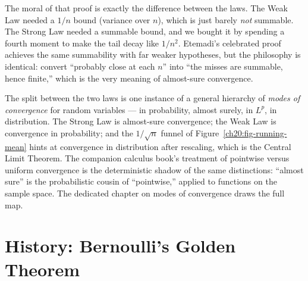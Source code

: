 The moral of that proof is exactly the difference between the laws. The Weak Law needed a $1/n$ bound (variance over $n$), which is just barely \emph{not} summable. The Strong Law needed a summable bound, and we bought it by spending a fourth moment to make the tail decay like $1/n^2$. Etemadi's celebrated proof achieves the same summability with far weaker hypotheses, but the philosophy is identical: convert ``probably close at each $n$'' into ``the misses are summable, hence finite,'' which is the very meaning of almost-sure convergence.

\begin{connectionbox}
The split between the two laws is one instance of a general hierarchy of \emph{modes of convergence} for random variables --- in probability, almost surely, in $L^p$, in distribution. The Strong Law is almost-sure convergence; the Weak Law is convergence in probability; and the $1/\sqrt n$ funnel of Figure~\ref{ch20:fig-running-mean} hints at convergence in distribution after rescaling, which is the Central Limit Theorem. The companion calculus book's treatment of pointwise versus uniform convergence is the deterministic shadow of the same distinctions: ``almost sure'' is the probabilistic cousin of ``pointwise,'' applied to functions on the sample space. The dedicated chapter on modes of convergence draws the full map.
\end{connectionbox}

\section{History: Bernoulli's Golden Theorem}
\label{ch20:history}

